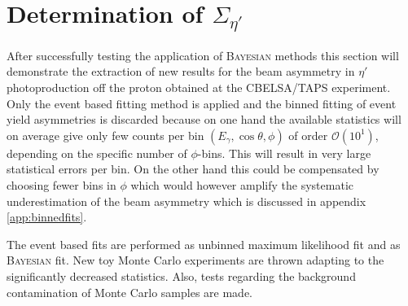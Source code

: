       
\section{Determination of $\Sigma_{\eta'}$}
\label{sec:sigma_etap}
After successfully testing the application of \textsc{Bayesian} methods this section will demonstrate the extraction of new results for the beam asymmetry in $\eta'$ photoproduction off the proton obtained at the CBELSA/TAPS experiment. Only the event based fitting method is applied and the binned fitting of event yield asymmetries is discarded because on one hand the available statistics will on average give only few counts per bin $\left(E_\gamma,\cos\theta,\phi\right)$ of order $\mathcal{O}\left(10^1\right)$, depending on the specific number of $\phi$-bins. This will result in very large statistical errors per bin. On the other hand this could be compensated by choosing fewer bins in $\phi$ which would however amplify the systematic underestimation of the beam asymmetry which is discussed in appendix \ref{app:binnedfits}.

The event based fits are performed as unbinned maximum likelihood fit and as \textsc{Bayesian} fit. New toy Monte Carlo experiments are thrown adapting to the significantly decreased statistics. Also, tests regarding the background contamination of Monte Carlo samples are made.   
